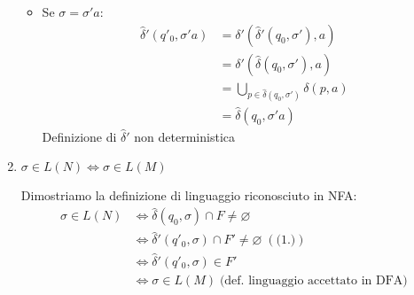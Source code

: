 \documentclass[a4paper]{article}
\begin{document}
\begin{theorem}
\begin{enumerate}
\begin{itemize}
        \item Se \( \sigma = \sigma'a \):
          \[
            \begin{aligned}
              \hat{\delta}'(q'_0, \sigma'a) &= \delta'(\hat{\delta}'(q_0, \sigma'), a)\\
                                            &= \delta'(\hat{\delta}(q_0, \sigma'), a)\\
                                            &= \bigcup_{p \in \hat{\delta}(q_0, \sigma')} \delta(p, a)\\
                                            &= \hat{\delta}(q_0, \sigma'a)
            \end{aligned}
          \] 
          Definizione di \( \hat{\delta}' \) non deterministica
      \end{itemize}
    \item
      \(
        \sigma \in L(N) \iff \sigma \in L(M)
      \) 

      \vspace{1em}
      \noindent
      Dimostriamo la definizione di linguaggio riconosciuto in NFA:
      \[
        \begin{aligned}
          \sigma \in L(N) &\iff \hat{\delta}(q_0, \sigma) \cap F \neq \varnothing\\
                          &\iff \hat{\delta}'(q'_0, \sigma) \cap F' \neq \varnothing \;(\text{(1.)})\\
                          &\iff \hat{\delta}'(q'_0, \sigma) \in F'\\
                          &\iff \sigma \in L(M) \; \text{(def. linguaggio accettato in DFA)}
        \end{aligned}
      \] 
  \end{enumerate}

\end{theorem}
\end{document}
